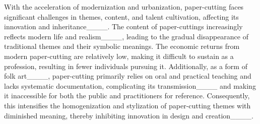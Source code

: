 
With the acceleration of modernization and urbanization, paper-cutting faces significant challenges in themes, content, and talent cultivation, affecting its innovation and inheritance____. The content of paper-cuttings increasingly reflects modern life and realism____, leading to the gradual disappearance of traditional themes and their symbolic meanings. The economic returns from modern paper-cutting are relatively low, making it difficult to sustain as a profession, resulting in fewer individuals pursuing it. Additionally, as a form of folk art____, paper-cutting primarily relies on oral and practical teaching and lacks systematic documentation, complicating its transmission____ and making it inaccessible for both the public and practitioners for reference. Consequently, this intensifies the homogenization and stylization of paper-cutting themes with diminished meaning, thereby inhibiting innovation in design and creation____.


